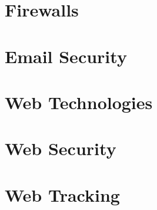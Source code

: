 	\newpage
	\section{Firewalls}

	\newpage
	\section{Email Security}

	\newpage
	\section{Web Technologies}	
	
	\newpage
	\section{Web Security}	
	
	\newpage
	\section{Web Tracking}	
		
